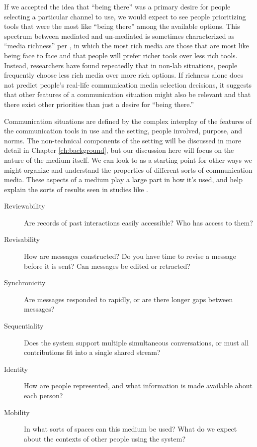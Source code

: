 If we accepted the idea that ``being there'' was a primary desire for people selecting a particular channel to use, we would expect to see people prioritizing tools that were the most like ``being there'' among the available options. This spectrum between mediated and un-mediated is sometimes characterized as ``media richness'' per \citet{Daft:1986p1548}, in which the most rich media are those that are most like being face to face and that people will prefer richer tools over less rich tools. Instead, researchers have found repeatedly that in non-lab situations, people frequently choose less rich media over more rich options. \citep{Scholl:2006p210} If richness alone does not predict people's real-life communication media selection decisions, it suggests that other features of a communication situation might also be relevant and that there exist other priorities than just a desire for ``being there.''


Communication situations are defined by the complex interplay of the features of the communication tools in use and the setting, people involved, purpose, and norms. The non-technical components of the setting will be discussed in more detail in Chapter \ref{ch:background}, but our discussion here will focus on the nature of the medium itself. We can look to \citet{Brennan:1991wk} as a starting point for other ways we might organize and understand the properties of different sorts of communication media. These aspects of a medium play a large part in how it's used, and help explain the sorts of results seen in studies like \citet{Scholl:2006p210}.

\begin{description}
\item [Reviewability]{Are records of past interactions easily accessible? Who has access to them?}
\item [Revisability]{How are messages constructed? Do you have time to revise a message before it is sent? Can messages be edited or retracted?}
\item [Synchronicity]{Are messages responded to rapidly, or are there longer gaps between messages?}
\item [Sequentiality]{Does the system support multiple simultaneous conversations, or must all contributions fit into a single shared stream?}
\item [Identity]{How are people represented, and what information is made available about each person?}
\item [Mobility]{In what sorts of spaces can this medium be used? What do we expect about the contexts of other people using the system?}
\end{description}


